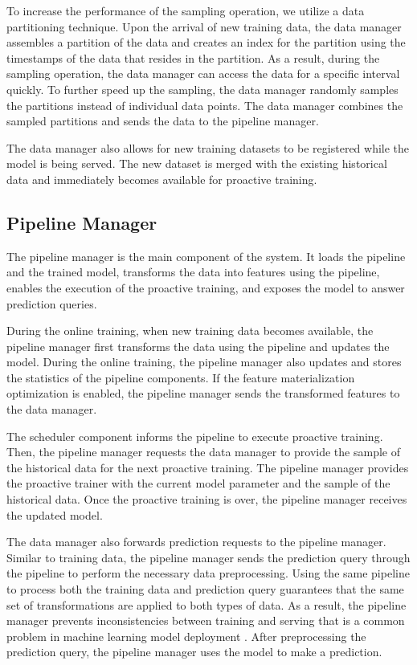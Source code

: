 To increase the performance of the sampling operation, we utilize a data partitioning technique.
Upon the arrival of new training data, the data manager assembles a partition of the data and creates an index for the partition using the timestamps of the data that resides in the partition.
As a result, during the sampling operation, the data manager can access the data for a specific interval quickly.
To further speed up the sampling, the data manager randomly samples the partitions instead of individual data points.
The data manager combines the sampled partitions and sends the data to the pipeline manager.

The data manager also allows for new training datasets to be registered while the model is being served.
The new dataset is merged with the existing historical data and immediately becomes available for proactive training.

\subsection{Pipeline Manager} \label{pipeline-manager} 
The pipeline manager is the main component of the system.
It loads the pipeline and the trained model, transforms the data into features using the pipeline, enables the execution of the proactive training, and exposes the model to answer prediction queries.

During the online training, when new training data becomes available, the pipeline manager first transforms the data using the pipeline and updates the model.
During the online training, the pipeline manager also updates and stores the statistics of the pipeline components.
If the feature materialization optimization is enabled, the pipeline manager sends the transformed features to the data manager.

The scheduler component informs the pipeline to execute proactive training.
Then, the pipeline manager requests the data manager to provide the sample of the historical data for the next proactive training.
The pipeline manager provides the proactive trainer with the current model parameter and the sample of the historical data.
Once the proactive training is over, the pipeline manager receives the updated model.

The data manager also forwards prediction requests to the pipeline manager.
Similar to training data, the pipeline manager sends the prediction query through the pipeline to perform the necessary data preprocessing.
Using the same pipeline to process both the training data and prediction query guarantees that the same set of transformations are applied to both types of data.
As a result, the pipeline manager prevents inconsistencies between training and serving that is a common problem in machine learning model deployment \cite{baylor2017tfx}.
After preprocessing the prediction query, the pipeline manager uses the model to make a prediction.

